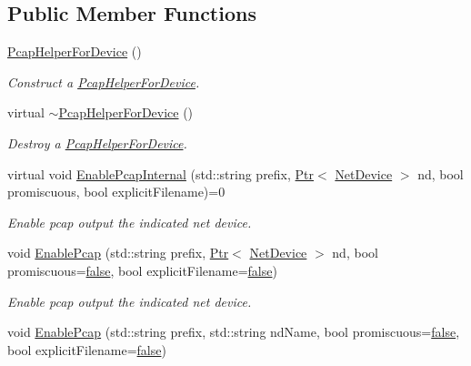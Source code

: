 \subsection*{Public Member Functions}
\begin{DoxyCompactItemize}
\item 
\hyperlink{classns3_1_1PcapHelperForDevice_abe996206303c0cea3c7288e0f40bc180}{Pcap\+Helper\+For\+Device} ()
\begin{DoxyCompactList}\small\item\em Construct a \hyperlink{classns3_1_1PcapHelperForDevice}{Pcap\+Helper\+For\+Device}. \end{DoxyCompactList}\item 
virtual \hyperlink{classns3_1_1PcapHelperForDevice_aae7a570f44720ba5bbc5f0b855013b4b}{$\sim$\+Pcap\+Helper\+For\+Device} ()
\begin{DoxyCompactList}\small\item\em Destroy a \hyperlink{classns3_1_1PcapHelperForDevice}{Pcap\+Helper\+For\+Device}. \end{DoxyCompactList}\item 
virtual void \hyperlink{classns3_1_1PcapHelperForDevice_aae5c1fa77e45af342b1e3f70bf604e0f}{Enable\+Pcap\+Internal} (std\+::string prefix, \hyperlink{classns3_1_1Ptr}{Ptr}$<$ \hyperlink{classns3_1_1NetDevice}{Net\+Device} $>$ nd, bool promiscuous, bool explicit\+Filename)=0
\begin{DoxyCompactList}\small\item\em Enable pcap output the indicated net device. \end{DoxyCompactList}\item 
void \hyperlink{classns3_1_1PcapHelperForDevice_a74866def9a881aa9d5c5be1225a26722}{Enable\+Pcap} (std\+::string prefix, \hyperlink{classns3_1_1Ptr}{Ptr}$<$ \hyperlink{classns3_1_1NetDevice}{Net\+Device} $>$ nd, bool promiscuous=\hyperlink{lte__cqi__generation_8m_ab1bef239d413c4da139c4bac92cd657a}{false}, bool explicit\+Filename=\hyperlink{lte__cqi__generation_8m_ab1bef239d413c4da139c4bac92cd657a}{false})
\begin{DoxyCompactList}\small\item\em Enable pcap output the indicated net device. \end{DoxyCompactList}\item 
void \hyperlink{classns3_1_1PcapHelperForDevice_a445b2b2f06b1d89ebedfa26678b5cae4}{Enable\+Pcap} (std\+::string prefix, std\+::string nd\+Name, bool promiscuous=\hyperlink{lte__cqi__generation_8m_ab1bef239d413c4da139c4bac92cd657a}{false}, bool explicit\+Filename=\hyperlink{lte__cqi__generation_8m_ab1bef239d413c4da139c4bac92cd657a}{false})

\end{DoxyCompactItemize}
